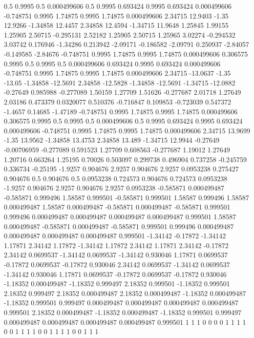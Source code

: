 0.5 0.9995
0.5 0.000499606
0.5 0.9995
0.693424 0.9995
0.693424 0.000499606
-0.748751 0.9995
1.74875 0.9995
1.74875 0.000499606
2.34715 12.9403
-1.35 12.9266
-1.34858 12.4457
2.34858 12.4594
-1.34715 11.9648
1.25845 1.99155
1.25905 2.50715
-0.295131 2.52182
1.25905 2.50715
1.25965 3.02274
-0.294532 3.03742
0.176946 -1.34286
0.213942 -2.09171
-0.186582 -2.09791
0.250937 -2.84057
-0.149585 -2.84676
-0.748751 0.9995
1.74875 0.9995
1.74875 0.000499606
0.306575 0.9995
0.5 0.9995
0.5 0.000499606
0.693424 0.9995
0.693424 0.000499606
-0.748751 0.9995
1.74875 0.9995
1.74875 0.000499606
2.34715 -13.0637
-1.35 -13.05
-1.34858 -12.5691
2.34858 -12.5828
-1.34858 -12.5691
-1.34715 -12.0882
-0.27649 0.985988
-0.277089 1.50159
1.27709 1.51626
-0.277687 2.01718
1.27649 2.03186
0.473379 0.0320077
0.510376 -0.716847
0.109853 -0.723039
0.547372 -1.4657
0.14685 -1.47189
-0.748751 0.9995
1.74875 0.9995
1.74875 0.000499606
0.306575 0.9995
0.5 0.9995
0.5 0.000499606
0.5 0.9995
0.693424 0.9995
0.693424 0.000499606
-0.748751 0.9995
1.74875 0.9995
1.74875 0.000499606
2.34715 13.9699
-1.35 13.9562
-1.34858 13.4753
2.34858 13.489
-1.34715 12.9944
-0.27649 -0.00706959
-0.277089 0.591523
1.27709 0.608563
-0.277687 1.19012
1.27649 1.20716
0.663264 1.25195
0.70026 0.503097
0.299738 0.496904
0.737258 -0.245759
0.336734 -0.25195
-1.9257 0.904676
2.9257 0.904676
2.9257 0.0953238
0.275427 0.904676
0.5 0.904676
0.5 0.0953238
0.724573 0.904676
0.724573 0.0953238
-1.9257 0.904676
2.9257 0.904676
2.9257 0.0953238
-0.585871 0.000499487
-0.585871 0.999496
1.58587 0.999501
-0.585871 0.999501
1.58587 0.999496
1.58587 0.000499487
1.58587 0.000499487
-0.585871 0.000499487
-0.585871 0.999501
0.999496 0.000499487
0.000499487 0.000499487
0.000499487 0.999501
1.58587 0.000499487
-0.585871 0.000499487
-0.585871 0.999501
0.999496 0.000499487
0.000499487 0.000499487
0.000499487 0.999501
-1.34142 -0.17872
-1.34142 1.17871
2.34142 1.17872
-1.34142 1.17872
2.34142 1.17871
2.34142 -0.17872
2.34142 0.0699537
-1.34142 0.0699537
-1.34142 0.930046
1.17871 0.0699537
-0.17872 0.0699537
-0.17872 0.930046
2.34142 0.0699537
-1.34142 0.0699537
-1.34142 0.930046
1.17871 0.0699537
-0.17872 0.0699537
-0.17872 0.930046
-1.18352 0.000499487
-1.18352 0.999497
2.18352 0.999501
-1.18352 0.999501
2.18352 0.999497
2.18352 0.000499487
2.18352 0.000499487
-1.18352 0.000499487
-1.18352 0.999501
0.999497 0.000499487
0.000499487 0.000499487
0.000499487 0.999501
2.18352 0.000499487
-1.18352 0.000499487
-1.18352 0.999501
0.999497 0.000499487
0.000499487 0.000499487
0.000499487 0.999501
1 1
1 0
0 0
0 1
1 1
1 0
0 1
1 1
1 0
0 1
1 1
1 0
0 1
1 1
